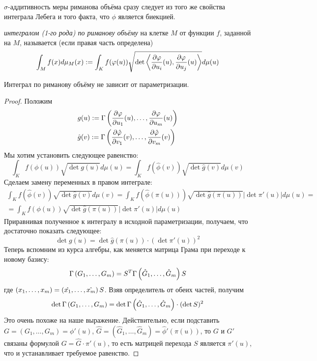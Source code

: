 \begin{note}
	$\sigma$-аддитивность меры риманова объёма сразу следует из того же свойства интеграла Лебега и того факта, что $\phi$ является биекцией.
\end{note}

\begin{definition}
	\textit{интегралом (1-го рода) по риманову объёму} на клетке $M$ от функции $f$, заданной на $M$, называется (если правая часть определена)
	\[
		\int_M f(x) d\mu_M(x) := \int_K f(\varphi(u)) \sqrt{\det\left\langle\frac{\partial \varphi}{\partial u_i}(u), \frac{\partial \varphi}{\partial u_j}(u)\right\rangle} d\mu(u)
	\]
\end{definition}

\begin{proposition}
	Интеграл по риманову объёму не зависит от параметризации.
\end{proposition}

\begin{proof}
	Положим
	\begin{align*}
		&{g(u) := \Gamma\left(\frac{\partial \varphi}{\partial u_1}(u), \hdots,  \frac{\partial \varphi}{\partial u_m}(u)\right)}\\
		&{\hat{g}(v) := \Gamma\left(\frac{\partial \hat{\varphi}}{\partial v_1}(v), \hdots,  \frac{\partial \hat{\varphi}}{\partial v_m}(v)\right)}
	\end{align*}
	Мы хотим установить следующее равенство:
	\[
		\int_K f(\phi(u)) \sqrt{\det{g(u)}} d\mu(u) = \int_K f(\hat\phi(v)) \sqrt{\det{\hat g(v)}} d\mu(v)
	\]
	Сделаем замену переменных в правом интеграле:
	\begin{multline*}
		\int_K f(\hat\phi(v)) \sqrt{\det{\hat g(v)}} d\mu(v) = \int_K f(\hat\phi(\pi(u))) \sqrt{\det{\hat g(\pi(u))}} |\det{\pi'(u)}| d\mu(u) =\\
		= \int_K f(\phi(u)) \sqrt{\det{\hat g(\pi(u))}} |\det{\pi'(u)}| d\mu(u)
	\end{multline*}
	Приравнивая полученное к интегралу в исходной параметризации, получаем, что достаточно показать следующее:
	\[
		\det{g(u)} = \det{\hat g(\pi(u))} \cdot (\det{\pi'(u)})^2
	\]
	Теперь вспомним из курса алгебры, как меняется матрица Грама при переходе к новому базису:
	\[
		\Gamma\left(G_1, \hdots, G_m\right) = S^T \Gamma\left(\hat G_1, \hdots, \hat G_m\right) S
	\]
	где $\left(x_1, \hdots, x_m\right) = \left(\hat{x_1}, \hdots, \hat{x_m}\right)S$.
	Взяв определитель от обеих частей, получим
	\[
		\det{\Gamma \left(G_1, \hdots, G_m\right) } = \det{\Gamma \left(\hat G_1, \hdots, \hat G_m\right) } \cdot (\det{S})^2
	\]
	Это очень похоже на наше выражение. Действительно, если подставить $G = (G_1, \ldots, G_m) = \phi'(u)$, $\hat G = (\hat G_1, \ldots, \hat G_m) = \hat\phi'(\pi(u))$, то
	$G$ и $G'$ связаны формулой $G = \hat G \cdot \pi'(u)$, то есть матрицей перехода $S$ является $\pi'(u)$, что и устанавливает требуемое равенство.
\end{proof}

